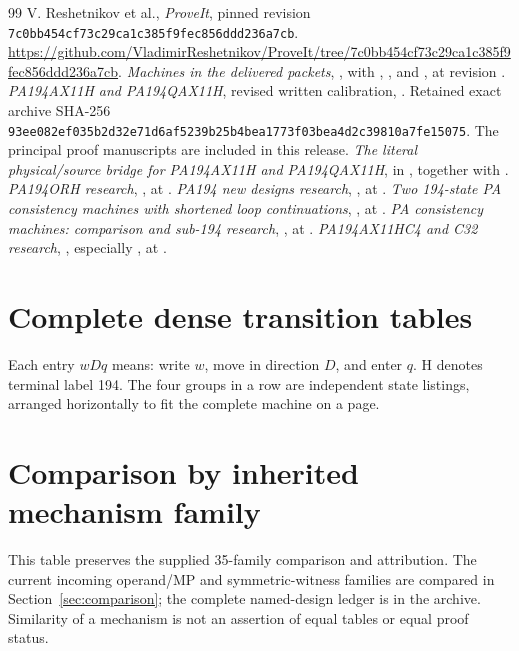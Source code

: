 \documentclass[11pt,a4paper]{article}
\newcommand{\hash}[1]{\nolinkurl{#1}}
\begin{document}
\begin{thebibliography}{99}
\small
\setlength{\itemsep}{0pt}\setlength{\parskip}{0pt}
 V. Reshetnikov et al., \emph{ProveIt}, pinned revision
\texttt{7c0bb454cf73c29ca1c385f9fec856ddd236a7cb}.
\url{https://github.com/VladimirReshetnikov/ProveIt/tree/7c0bb454cf73c29ca1c385f9fec856ddd236a7cb}.
 \emph{Machines in the delivered packets},
, with
, , and ,
at revision \cite{repo}.
 \emph{PA194AX11H and PA194QAX11H}, revised written calibration,
. Retained exact archive
SHA-256 \hash{93ee082ef035b2d32e71d6af5239b25b4bea1773f03bea4d2c39810a7fe15075}.
The principal proof manuscripts are included in this release.
 \emph{The literal physical/source bridge for
PA194AX11H and PA194QAX11H},  in
\cite{ax11h}, together with .
 \emph{PA194ORH research},
, at \cite{repo}.
 \emph{PA194 new designs research},
, at \cite{repo}.
 \emph{Two 194-state PA consistency machines with
shortened loop continuations},
, at \cite{repo}.
 \emph{PA consistency machines: comparison and sub-194
research}, , at \cite{repo}.
 \emph{PA194AX11HC4 and C32 research},
,
especially , at \cite{repo}.
\end{thebibliography}

\appendix
\clearpage
\section{Complete dense transition tables}\label{app:tables}
Each entry $wDq$ means: write $w$, move in direction $D$, and enter $q$.
H denotes terminal label 194. The four groups in a row are independent
state listings, arranged horizontally to fit the complete machine on a page.


\clearpage
\section{Comparison by inherited mechanism family}\label{app:families}
This table preserves the supplied 35-family comparison and attribution.
The current incoming operand/MP and symmetric-witness families are compared
in Section~\ref{sec:comparison}; the complete named-design ledger is in the
archive. Similarity of a mechanism is not an assertion of equal tables or
equal proof status.

\end{document}

